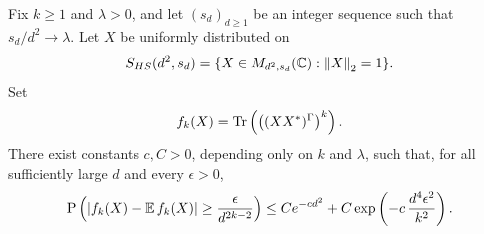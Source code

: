 \begin{theorem}
\label{thm:local_lipschitz_concentration}
Fix \(k\ge1\) and \(\lambda>0\), and let \((s_d)_{d\ge1}\) be an integer
sequence such that \(s_d/d^2\to\lambda\).  Let \(X\) be uniformly distributed
on
\[
    S_{HS}(d^2,s_d)=\{X\in M_{d^2,s_d}(\mathbb{C}):\left\lVert X\right\rVert_2=1\}.
\]
Set
\[
    f_k(X)=\operatorname{Tr}\left(\left((XX^*)^\Gamma\right)^k\right).
\]
There exist constants \(c,C>0\), depending only on \(k\) and \(\lambda\), such
that, for all sufficiently large \(d\) and every \(\epsilon>0\),
\begin{equation}
\label{eq:local_lipschitz_concentration_theorem}
    \operatorname{P}\left(\left\lvert f_k(X)-\operatorname{\mathbb{E}} f_k(X)\right\rvert
    \geq \frac{\epsilon}{d^{2k-2}}\right)
    \leq C e^{-c d^2}
    +C\exp\left(-c\,\frac{d^4\epsilon^2}{k^2}\right).
\end{equation}
\end{theorem}

